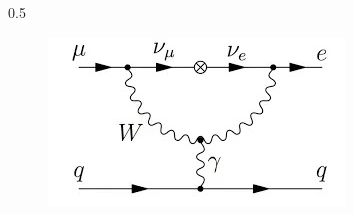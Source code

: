 \documentclass{beamer}
\begin{document}
\begin{frame}
\begin{columns}
\begin{column}{0.5\framewidth}
        \begin{figure}[h]
            \centering
            \includegraphics[width=0.7\columnwidth]{figures/jpg/1_erkKoywyuFzJmMv4PKpc9Q.jpg}
        \end{figure} 
    \end{column}
\end{columns}
\end{frame}

\end{document}

